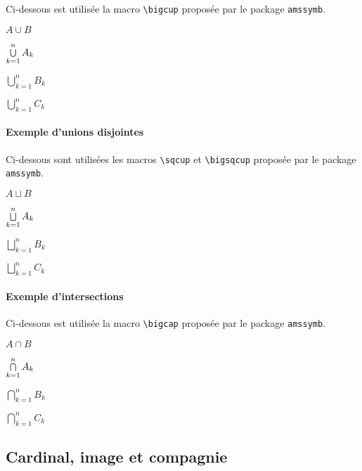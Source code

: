 \documentclass[12pt,a4paper]{article}
\newcommand\env[1]{\texttt{#1}}
\newcommand\macro[1]{\env{\textbackslash{}#1}}
\theoremstyle{definition}
\begin{document}
Ci-dessous est utilisée la macro \macro{bigcup} proposée par le package \verb+amssymb+.

\begin{latexex}
$A \cup B$

$\dcup_{k=1}^{n} A_k$

$\bigcup_{k=1}^{n} B_k$

$\displaystyle \bigcup_{k=1}^{n} C_k$
\end{latexex}




\paragraph{Exemple d'unions disjointes}

Ci-dessous sont utilisées les macros \macro{sqcup} et \macro{bigsqcup} proposée par le package \verb+amssymb+.

\begin{latexex}
$A\sqcup B$

$\dsqcup_{k=1}^{n} A_k$

$\bigsqcup_{k=1}^{n} B_k$

$\displaystyle \bigsqcup_{k=1}^{n} C_k$
\end{latexex}




\paragraph{Exemple d'intersections}

Ci-dessous est utilisée la macro \macro{bigcap} proposée par le package \verb+amssymb+.

\begin{latexex}
$A \cap B$

$\dcap_{k=1}^{n} A_k$

$\bigcap_{k=1}^{n} B_k$

$\displaystyle \bigcap_{k=1}^{n} C_k$
\end{latexex}



\subsection{Cardinal, image et compagnie}
\end{document}
